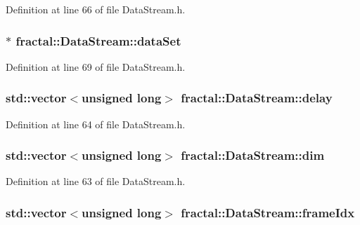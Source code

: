 Definition at line 66 of file Data\+Stream.\+h.

\hypertarget{classfractal_1_1DataStream_a839fc0232b60bc2f7c156370d0e6f9db}{
\subsubsection[{data\+Set}]{$\ast$ fractal\+::\+Data\+Stream\+::data\+Set\hspace{0.3cm}{\ttfamily [protected]}}}\label{classfractal_1_1DataStream_a839fc0232b60bc2f7c156370d0e6f9db}


Definition at line 69 of file Data\+Stream.\+h.

\hypertarget{classfractal_1_1DataStream_aee0c7dd8635f71a1e1de54a420894b59}{
\subsubsection[{delay}]{\setlength{\rightskip}{0pt plus 5cm}std\+::vector$<$unsigned long$>$ fractal\+::\+Data\+Stream\+::delay\hspace{0.3cm}{\ttfamily [protected]}}}\label{classfractal_1_1DataStream_aee0c7dd8635f71a1e1de54a420894b59}


Definition at line 64 of file Data\+Stream.\+h.

\hypertarget{classfractal_1_1DataStream_a067bd83ca8fc147bc86c925fc8251a07}{
\subsubsection[{dim}]{\setlength{\rightskip}{0pt plus 5cm}std\+::vector$<$unsigned long$>$ fractal\+::\+Data\+Stream\+::dim\hspace{0.3cm}{\ttfamily [protected]}}}\label{classfractal_1_1DataStream_a067bd83ca8fc147bc86c925fc8251a07}


Definition at line 63 of file Data\+Stream.\+h.

\hypertarget{classfractal_1_1DataStream_a9e9a2c8d0f4aa79b44b78eda8ad9e58e}{
\subsubsection[{frame\+Idx}]{\setlength{\rightskip}{0pt plus 5cm}std\+::vector$<$unsigned long$>$ fractal\+::\+Data\+Stream\+::frame\+Idx\hspace{0.3cm}{\ttfamily [protected]}}}\label{classfractal_1_1DataStream_a9e9a2c8d0f4aa79b44b78eda8ad9e58e}


